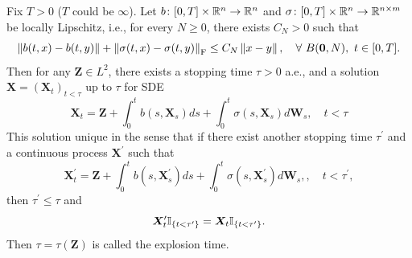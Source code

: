 \begin{thm}
    Fix $T > 0$ ($T$ could be $\infty$). Let $b \colon [0,T] \times \mathbb{R}^n \rightarrow \mathbb{R}^n$ and $\sigma \colon [0,T] \times \mathbb{R}^n \rightarrow \mathbb{R}^{n \times m}$ be locally Lipschitz, i.e., for every $N \geq 0$, there exists $C_N > 0$ such that
    \begin{equation*}
        \left\lVert b(t,x)-b(t,y)\right\lVert + \left\lVert\sigma(t,x)-\sigma(t,y)\right\lVert_{\operatorname{F}} \leq C_N\left\lVert x-y\right\lVert,\quad \forall~B(\bm{0},N),~t \in [0,T].
    \end{equation*}
    Then for any $\bm{Z} \in L^2$, there exists a stopping time $\tau > 0$ a.e., and a solution $\bm{X}=(\bm{X}_t)_{t <\tau}$ up to $\tau$ for SDE
    \begin{equation*}
        \bm{X}_{t} = \bm{Z} + \int_0^{t}b(s,\bm{X}_s)ds+\int_0^{t}\sigma(s,\bm{X}_s)d\bm{W}_s,\quad t < \tau
    \end{equation*}
    This solution unique in the sense that if there exist another stopping time $\tau^\prime$ and a continuous process $\bm{X}^\prime$ such that
    \begin{equation*}
        \bm{X}^\prime_{t} = \bm{Z} + \int_0^{t}b(s,\bm{X}^\prime_s)ds+\int_0^{t}\sigma(s,\bm{X}^\prime_s)d\bm{W}_s,,\quad t < \tau^\prime,
    \end{equation*}
    then $\tau^\prime \leq \tau$ and 
    \begin{equation*}
        \bm{X}^\prime_t\mathbb{I}_{\left\{t < \tau^\prime\right\}} = \bm{X}_t\mathbb{I}_{\left\{t < \tau^\prime\right\}}.
    \end{equation*}
    Then $\tau = \tau(\bm{Z})$ is called the explosion time.
\end{thm}
